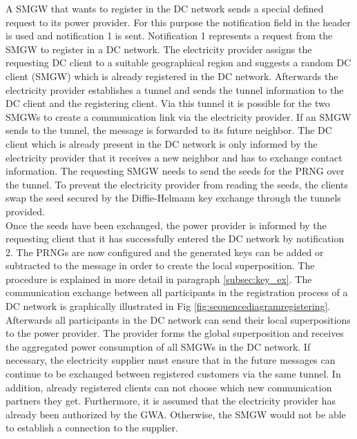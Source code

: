 A \gls{SMGW} that wants to register in the DC network sends a special defined request to its power provider. For this purpose the notification field in the header is used and notification 1 is sent. Notification 1 represents a request from the \gls{SMGW} to register in a DC network. The electricity provider assigns the requesting DC client to a suitable geographical region and suggests a random DC client (\gls{SMGW}) which is already registered in the DC network. Afterwards the electricity provider establishes a tunnel and sends the tunnel information to the DC client and the registering client. Via this tunnel it is possible for the two \gls{SMGW}s to create a communication link via the electricity provider. If an \gls{SMGW} sends to the tunnel, the message is forwarded to its future neighbor. The DC client which is already present in the DC network is only informed by the electricity provider that it receives a new neighbor and has to exchange contact information. The requesting \gls{SMGW} needs to send the seeds for the PRNG over the tunnel. To prevent the electricity provider from reading the seeds, the clients swap the seed secured by the Diffie-Helmann key exchange through the tunnels provided.\\%
Once the seeds have been exchanged, the power provider is informed by the requesting client that it has successfully entered the DC network by notification 2. The PRNGs are now configured and the generated keys can be added or subtracted to the message in order to create the local superposition. The procedure is explained in more detail in paragraph \ref{subsec:key_ex}.%
The communication exchange between all participants in the registration process of a DC network is graphically illustrated in Fig \ref{fig:sequencediagramregistering}. %
Afterwards all participants in the DC network can send their local superpositions to the power provider. The provider forms the global superposition and receives the aggregated power consumption of all \gls{SMGW}s in the DC network. If necessary, the electricity supplier must ensure that in the future messages can continue to be exchanged between registered customers via the same tunnel. In addition, already registered clients can not choose which new communication partners they get. Furthermore, it is assumed that the electricity provider has already been authorized by the \gls{GWA}. Otherwise, the \gls{SMGW} would not be able to establish a connection to the supplier.\\
